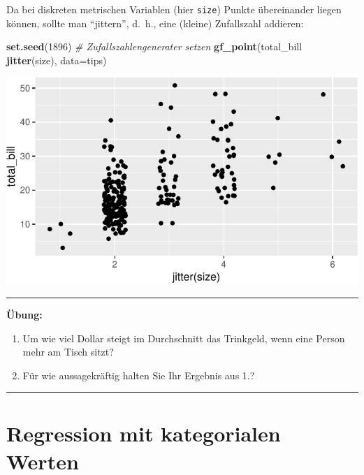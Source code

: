 \documentclass[12pt,ngerman,paper=a4,pagesize,DIV=13]{scrreprt}
\newenvironment{Shaded}{\begin{snugshade}}{\end{snugshade}}
\newcommand{\CommentTok}[1]{\textcolor[rgb]{0.56,0.35,0.01}{\textit{#1}}}
\newcommand{\DataTypeTok}[1]{\textcolor[rgb]{0.13,0.29,0.53}{#1}}
\newcommand{\DecValTok}[1]{\textcolor[rgb]{0.00,0.00,0.81}{#1}}
\newcommand{\KeywordTok}[1]{\textcolor[rgb]{0.13,0.29,0.53}{\textbf{#1}}}
\newcommand{\NormalTok}[1]{#1}
\newcommand{\OperatorTok}[1]{\textcolor[rgb]{0.81,0.36,0.00}{\textbf{#1}}}
\newcommand{\StringTok}[1]{\textcolor[rgb]{0.31,0.60,0.02}{#1}}
\providecommand{\tightlist}{%
  \setlength{\itemsep}{0pt}\setlength{\parskip}{0pt}}
\begin{document}
Da bei diskreten metrischen Variablen (hier \texttt{size}) Punkte
übereinander liegen können, sollte man \enquote{jittern}, d.~h., eine
(kleine) Zufallszahl addieren:

\begin{Shaded}
\begin{Highlighting}[]
\KeywordTok{set.seed}\NormalTok{(}\DecValTok{1896}\NormalTok{) }\CommentTok{# Zufallszahlengenerater setzen}
\KeywordTok{gf_point}\NormalTok{(total_bill }\OperatorTok{~}\StringTok{ }\KeywordTok{jitter}\NormalTok{(size), }\DataTypeTok{data=}\NormalTok{tips)}
\end{Highlighting}
\end{Shaded}

\includegraphics{DatenerhebungStatistik-Uebung_files/figure-latex/unnamed-chunk-168-1.pdf}

\begin{center}\rule{0.5\linewidth}{\linethickness}\end{center}

\textbf{Übung:}

\begin{enumerate}
\def\labelenumi{\arabic{enumi}.}
\tightlist
\item
  Um wie viel Dollar steigt im Durchschnitt das Trinkgeld, wenn eine
  Person mehr am Tisch sitzt?
\item
  Für wie aussagekräftig halten Sie Ihr Ergebnis aus 1.?
\end{enumerate}

\begin{center}\rule{0.5\linewidth}{\linethickness}\end{center}

\hypertarget{regression-mit-kategorialen-werten}{%
\section{Regression mit kategorialen
Werten}\label{regression-mit-kategorialen-werten}}
\end{document}
